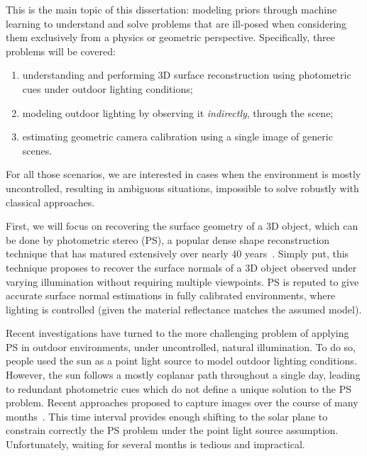 This is the main topic of this dissertation: modeling priors through machine learning to understand and solve problems that are ill-posed when considering them exclusively from a physics or geometric perspective. Specifically, three problems will be covered: 
\begin{enumerate}
\item understanding and performing 3D surface reconstruction using photometric cues under outdoor lighting conditions;
\item modeling outdoor lighting by observing it \emph{indirectly}, through the scene;
\item estimating geometric camera calibration using a single image of generic scenes.
\end{enumerate}
For all those scenarios, we are interested in cases when the environment is mostly uncontrolled, resulting in ambiguous situations, impossible to solve robustly with classical approaches. 

First, we will focus on recovering the surface geometry of a 3D object, which can be done by photometric stereo (PS), a popular dense shape reconstruction technique that has matured extensively over nearly 40 years~\cite{woodham-opteng-80}. %
Simply put, this technique proposes to recover the surface normals of a 3D object observed under varying illumination without requiring multiple viewpoints. 
PS is reputed to give accurate surface normal estimations in fully calibrated environments, where lighting is controlled (given the material reflectance matches the assumed model). 

Recent investigations have turned to the more challenging problem of applying PS in outdoor environments, under uncontrolled, natural illumination. To do so, people used the sun as a point light source to model outdoor lighting conditions. However, the sun follows a mostly coplanar path throughout a single day, leading to redundant photometric cues which do not define a unique solution to the PS problem. Recent approaches proposed to capture images over the course of many months~\cite{ackermann-cvpr-12,abrams-eccv-12}. This time interval provides enough shifting to the solar plane to constrain correctly the PS problem under the point light source assumption. Unfortunately, waiting for several months is tedious and impractical. 


